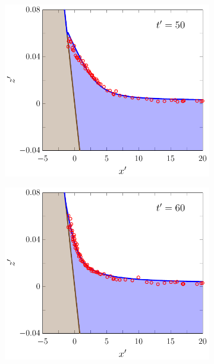 \documentclass[times]{elsarticle}
\begin{document}
\begin{figure}
\begin{subfigure}{0.5\textwidth}
	\end{subfigure}
	\begin{subfigure}{0.5\textwidth}
		\includegraphics[width=\textwidth]{./Figures/Experimental/Synolakis/nonbreaking/50s.pdf}
		\vspace{0.2cm}
	\end{subfigure}%
	\begin{subfigure}{0.5\textwidth}
		\includegraphics[width=\textwidth]{./Figures/Experimental/Synolakis/nonbreaking/60s.pdf}
		\vspace{0.2cm}

\end{subfigure}
\end{figure}
\end{document}
